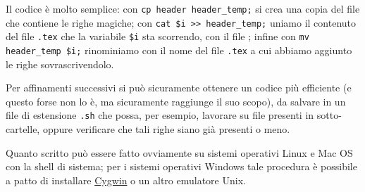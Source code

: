Il codice è molto semplice: con \verb!cp header header_temp;! si crea una copia del file che contiene le righe magiche; con \verb!cat $i >> header_temp;! uniamo il contenuto del file \texttt{.tex} che la variabile \verb!$i! sta scorrendo, con il file ; infine con \verb!mv header_temp $i;! rinominiamo  con il nome del file \texttt{.tex} a cui abbiamo aggiunto le righe sovrascrivendolo.

Per affinamenti successivi si può sicuramente ottenere un codice più efficiente (e questo forse non lo è, ma sicuramente raggiunge il suo scopo), da salvare in un file di estensione \texttt{.sh} che possa, per esempio, lavorare su file presenti in sotto-cartelle, oppure verificare che tali righe siano già presenti o meno. 

Quanto scritto può essere fatto ovviamente su sistemi operativi Linux e Mac OS con la shell di sistema; per i sistemi operativi Windows tale procedura è possibile a patto di installare \href{http://www.cygwin.com/}{Cygwin} o un altro emulatore Unix.


\endinput

\section{Creazione di cartelle ramificate}
\section{Aprire il terminale da una cartella}
\section{Redirezione dei dati}
\section{Operare con i diritti di root}
\section{Scripting}




